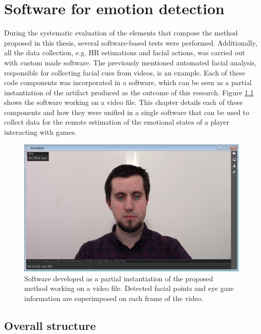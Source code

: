 \chapter{Software for emotion detection}
\label{ch:software}

During the systematic evaluation of the elements that compose the method proposed in this thesis, several software-based tests were performed. Additionally, all the data collection, e.g. HR estimations and facial actions, was carried out with custom made software. The previously mentioned automated facial analysis, responsible for collecting facial cues from videos, is an example. Each of these code components was incorporated in a software, which can be seen as a partial instantiation of the artifact produced as the outcome of this research. Figure \ref{fig:readmind-main-window} shows the software working on a video file. This chapter details each of these components and how they were unified in a single software that can be used to collect data for the remote estimation of the emotional states of a player interacting with games.

\begin{figure}[h!]
    \centering
    \includegraphics[width=\textwidth]{Content/figures/tool-main-window.png}
    \caption{Software developed as a partial instantiation of the proposed method working on a video file. Detected facial points and eye gaze information are superimposed on each frame of the video.}
    \label{fig:readmind-main-window}
\end{figure}

\section{Overall structure}

